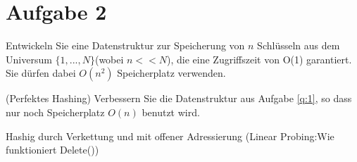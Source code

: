 \section*{Aufgabe 2}
	Entwickeln Sie eine Datenstruktur zur Speicherung von $n$ Schlüsseln aus dem Universum $\{1,...,N\}$(wobei $n<<N$), die eine Zugriffszeit von O(1) garantiert. Sie dürfen dabei $O(n^2)$ Speicherplatz verwenden.

	(Perfektes Hashing) Verbessern Sie die Datenstruktur aus Aufgabe \ref{q:1}, so dass nur noch Speicherplatz $O(n)$ benutzt wird.
	
	Hashig durch Verkettung und mit offener Adressierung (Linear Probing:Wie funktioniert Delete())
